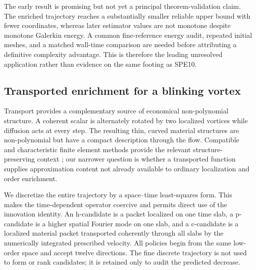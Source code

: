 \documentclass[11pt]{article}
\numberwithin{algorithm}{section}
\theoremstyle{definition}\newtheorem{definition}[theorem]{Definition}
\theoremstyle{remark}\newtheorem{remark}[theorem]{Remark}
\begin{document}
\begin{table}[h]
\centering
\caption{Preliminary matched-cost L-shaped Poisson test.  Certificates are
normalized by their common initial value.  The rows report the closest states
below approximately 35 and 50 free coordinates.}
\label{tab:lshape-singular-preliminary}
\end{table}

The early result is promising but not yet a principal theorem-validation
claim.  The enriched trajectory reaches a substantially smaller reliable
upper bound with fewer coordinates, whereas later estimator values are not
monotone despite monotone Galerkin energy.  A common fine-reference energy
audit, repeated initial meshes, and a matched wall-time comparison are needed
before attributing a definitive complexity advantage.  This is therefore the
leading unresolved application rather than evidence on the same footing as
SPE10.

\subsection{Transported enrichment for a blinking vortex}
Transport provides a complementary source of economical non-polynomial
structure.  A coherent scalar is
alternately rotated by two localized vortices while diffusion acts at every
step.  The resulting thin, curved material structures are non-polynomial but
have a compact description through the flow.  Compatible and characteristic finite element
methods provide the relevant structure-preserving context
\cite{cotter2023,douglasrussell1982}; our narrower question is whether a
transported function supplies approximation content not already available to
ordinary localization and order enrichment.

We discretize the entire trajectory by a space--time least-squares form.  This
makes the time-dependent operator coercive and permits direct use of the
innovation identity.  An h-candidate is a packet localized on one time slab, a
p-candidate is a higher spatial Fourier mode on one slab, and a c-candidate is
a localized material packet transported coherently through all slabs by the
numerically integrated prescribed velocity.  All policies begin from the same
low-order space and accept twelve directions.  The fine discrete trajectory is
not used to form or rank candidates; it is retained only to audit the predicted
decrease.
\end{document}
